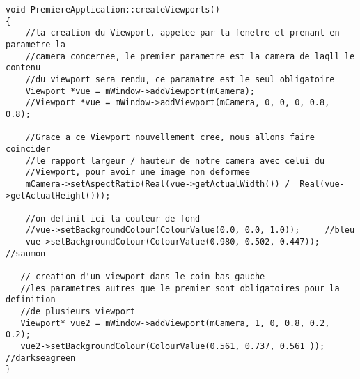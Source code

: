 \begin{lstlisting}[caption={PremiereApplication.cpp: ajout d'une m\'ethode pour la gestion de lumi\`ere et des ombres}]
void PremiereApplication::createViewports()
{
    //la creation du Viewport, appelee par la fenetre et prenant en parametre la
    //camera concernee, le premier parametre est la camera de laqll le contenu
    //du viewport sera rendu, ce paramatre est le seul obligatoire
    Viewport *vue = mWindow->addViewport(mCamera);
    //Viewport *vue = mWindow->addViewport(mCamera, 0, 0, 0, 0.8, 0.8);

    //Grace a ce Viewport nouvellement cree, nous allons faire coincider
    //le rapport largeur / hauteur de notre camera avec celui du
    //Viewport, pour avoir une image non deformee
    mCamera->setAspectRatio(Real(vue->getActualWidth()) /  Real(vue->getActualHeight()));

    //on definit ici la couleur de fond
    //vue->setBackgroundColour(ColourValue(0.0, 0.0, 1.0));     //bleu
    vue->setBackgroundColour(ColourValue(0.980, 0.502, 0.447)); //saumon

   // creation d'un viewport dans le coin bas gauche
   //les parametres autres que le premier sont obligatoires pour la definition
   //de plusieurs viewport
   Viewport* vue2 = mWindow->addViewport(mCamera, 1, 0, 0.8, 0.2, 0.2);
   vue2->setBackgroundColour(ColourValue(0.561, 0.737, 0.561 ));  //darkseagreen
}


\end{lstlisting}



